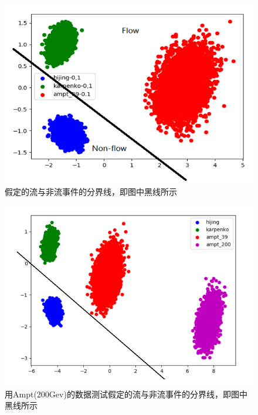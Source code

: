 \documentclass[aps,pre,12pt,preprint,onecolumn,showpacs,showkeys]{revtex4-1}
\begin{document}
\begin{figure}[t]
\centering
\includegraphics[width=140mm]{qb}
\caption{\label{fig:qb}%
假定的流与非流事件的分界线，即图中黑线所示}
\end{figure}
\begin{figure}[t]
\centering
\includegraphics[width=140mm]{cs}
\caption{\label{fig:cs}%
用Ampt(200Gev)的数据测试假定的流与非流事件的分界线，即图中黑线所示}
\end{figure}
\end{document}
